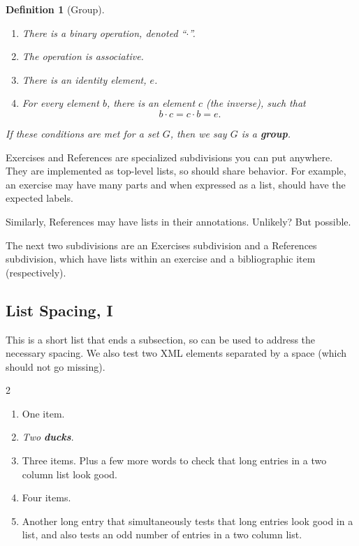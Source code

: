 \documentclass[pdflatex]{sn-jnl}
\theoremstyle{thmstyleone}%
\theoremstyle{thmstyletwo}%
\newtheorem{definition}[theorem]{Definition}
\theoremstyle{thmstylethree}%
\newcommand{\alert}[1]{\textbf{\textit{#1}}}
\newcommand{\terminology}[1]{\textbf{#1}}
\numberwithin{equation}{section}
\begin{document}
\begin{definition}[Group]\label{section-lists-2-18}%
%
%
%
\begin{enumerate}[label={\alph*)}]
\item{}There is a binary operation, denoted ``\(\cdot\)''.%
\item{}The operation is associative.%
\item{}There is an identity element, \(e\).%
\item{}For every element \(b\), there is an element \(c\) (the inverse), such that%
\begin{equation*}
b\cdot c=c\cdot b = e\text{.}
\end{equation*}
%
\end{enumerate}
%
\par
If these conditions are met for a set \(G\), then we say \(G\) is a \terminology{group}.%
\end{definition}
Exercises and References are specialized subdivisions you can put anywhere.  They are implemented as top-level lists, so should share behavior.  For example, an exercise may have many parts and when expressed as a list, should have the expected labels.%
\par
Similarly, References may have lists in their annotations.  Unlikely?  But possible.%
\par
The next two subdivisions are an Exercises subdivision and a References subdivision, which have lists within an exercise and a bibliographic item (respectively).%
%
%
\typeout{************************************************}
\typeout{************************************************}
%
\subsection{List Spacing, I}\label{section-lists-3}%
This is a short list that ends a subsection, so can be used to address the necessary spacing.  We also test two XML elements separated by a space (which should not go missing).%
\begin{multicols}{2}
\begin{enumerate}[label={(\alph*)}]
\item{}One item.%
\item{}\emph{Two} \alert{ducks}.%
\item{}Three items.  Plus a few more words to check that long entries in a two column list look good.%
\item{}Four items.%
\item{}Another long entry that simultaneously tests that long entries look good in a list, and also tests an odd number of entries in a two column list.%
\end{enumerate}
\end{multicols}
%
%
%
\typeout{************************************************}
\typeout{************************************************}
%
\end{document}
